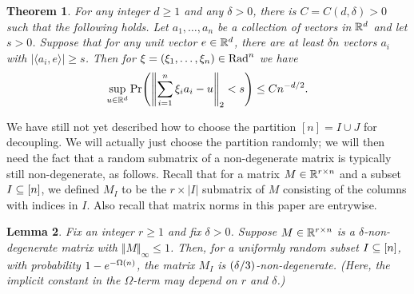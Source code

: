 \documentclass{daj}
\theoremstyle{plain}
\newtheorem{thm}{Theorem}[section]
\theoremstyle{plain}
\newtheorem{lem}[thm]{Lemma}
\theoremstyle{plain}
\theoremstyle{plain}
\theoremstyle{definition}
\theoremstyle{plain}
\theoremstyle{plain}
\theoremstyle{definition}
\theoremstyle{definition}
\theoremstyle{plain}
\let\originalleft\left
\let\originalright\right
\renewcommand{\left}{\mathopen{}\mathclose\bgroup\originalleft}
\renewcommand{\right}{\aftergroup\egroup\originalright}
\begin{document}
\begin{thm}
\label{thm:halasz}For any integer $d\geq 1$ and any $\delta>0$, there is $C=C(d,\delta)>0$ such that the following holds. Let $a_{1},\dots,a_{n}$ be a collection of vectors in $\mathbb{R}^{d}$ and let $s>0$. Suppose that for any unit vector $e\in\mathbb{R}^{d}$, there are at least $\delta n$ vectors $a_{i}$ with $|\langle a_{i},e\rangle|\ge s$.
Then for $\xi=(\xi_1,\dots,\xi_n)\in\operatorname{Rad}^{n}$ we have
\[
\sup_{u\in\RR^{d}}\Pr\left(\left\Vert \sum_{i=1}^{n}\xi_{i}a_{i}-u\right\Vert _{2}<s\right)\le Cn^{-d/2}.
\]
\end{thm}

We have still not yet described how to choose the partition $[n]=I\cup J$ for decoupling. We will actually just choose the partition randomly; we will then need the fact that a random submatrix of a non-degenerate
matrix is typically still non-degenerate, as follows. Recall that for a matrix $M\in \mathbb{R}^{r\times n}$ and a subset $I\subseteq [n]$, we defined $M_I$ to be the $r\times |I|$ submatrix of $M$ consisting of the columns with indices in $I$. Also recall that matrix norms in this paper are entrywise.

\begin{lem}
\label{lem:inherit-non-degeneracy}Fix an integer $r\geq 1$ and fix $\delta>0$. Suppose $M\in\mathbb{R}^{r\times n}$ is a $\delta$-non-degenerate matrix with $\Vert M\Vert_\infty\le 1$. Then, for a uniformly random subset $I\subseteq [n]$, with probability $1-e^{-\Omega\left(n\right)}$,
the matrix $M_{I}$ is $\left(\delta/3\right)$-non-degenerate. (Here, the implicit constant in the $\Omega$-term may depend on $r$ and $\delta$.)
\end{lem}
\end{document}
